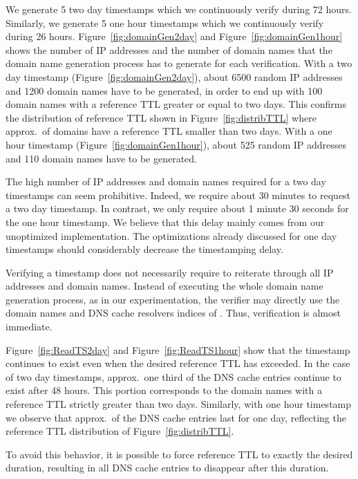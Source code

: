 We generate 5 two day timestamps which we continuously verify during 72 hours. Similarly, we generate 5 one hour timestamps which we continuously verify during 26 hours.
Figure~\ref{fig:domainGen2day} and  Figure~\ref{fig:domainGen1hour} shows the number of IP addresses and the number of domain names that the domain name generation process has to generate for each verification. 
With a two day timestamp (Figure~\ref{fig:domainGen2day}), about 6500 random IP addresses and 1200 domain names have to be generated, in order to end up with 100 domain names with a reference TTL greater or equal to two days. This confirms the distribution of reference TTL shown in Figure~\ref{fig:distribTTL} where approx.\  of domains have a reference TTL smaller than two days. With a one hour timestamp (Figure~\ref{fig:domainGen1hour}), about 525 random IP addresses and 110 domain names have to be generated.

The high number of IP addresses and domain names required for a two day timestamps can seem prohibitive. Indeed, we require about 30 minutes to request a two day timestamp. In contrast, we only require about 1 minute 30 seconds for the one hour timestamp. We believe that this delay mainly comes from our unoptimized implementation. The optimizations already discussed for one day timestamps should considerably decrease the timestamping delay.

Verifying a timestamp does not necessarily require to reiterate through all IP addresses and domain names.
Instead of executing the whole domain name generation process, as in our experimentation, the verifier may directly use the domain names and DNS cache resolvers indices of . Thus, verification is almost immediate.

Figure~\ref{fig:ReadTS2day} and Figure~\ref{fig:ReadTS1hour} show that the timestamp continues to exist even when the desired reference TTL has exceeded. In the case of two day timestamps, approx.\ one third of the DNS cache entries continue to exist after 48 hours. This portion corresponds to the domain names with a reference TTL strictly greater than two days. Similarly, with one hour timestamp we observe that approx.\  of the DNS cache entries last for one day, reflecting the reference TTL distribution of Figure~\ref{fig:distribTTL}.

To avoid this behavior, it is possible to force reference TTL to exactly the desired duration, resulting in all DNS cache entries to disappear after this duration.



